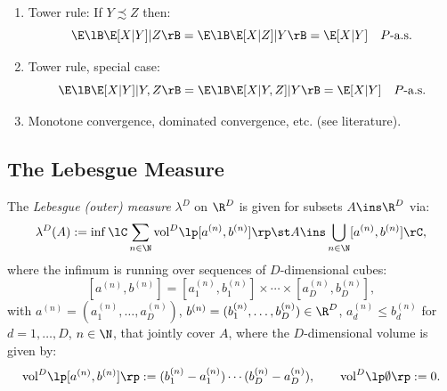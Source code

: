 \begin{Thm}
\begin{enumerate}
        \item Tower rule: If $Y \precsim Z$ then:
            \[ \E\lB\E[X|Y]|Z\rB = \E\lB\E[X|Z]|Y\rB = \E[X|Y]\quad P\text{-a.s.}    \]
        \item Tower rule, special case:
            \[ \E\lB\E[X|Y]|Y,Z\rB = \E\lB\E[X|Y,Z]|Y\rB = \E[X|Y]\quad P\text{-a.s.}    \]
        \item Monotone convergence, dominated convergence, etc. (see literature).
    \end{enumerate}
\end{Thm}


\subsection{The Lebesgue Measure}

\begin{Def}
    \label{thm-lebesgue-measure}
    The \emph{Lebesgue (outer) measure} $\lambda^D$ on $\R^D$ is given for subsets $A \ins \R^D$ via:
    \[ \lambda^D(A) := \inf\lC \sum_{n \in \N} \mathrm{vol}^D\lp [a^{(n)},b^{(n)}] \rp  \st  
    A \ins \bigcup_{n \in \N} [a^{(n)},b^{(n)}]  \rC, \]
    where the infimum is running over sequences of $D$-dimensional cubes:
     \[ [a^{(n)},b^{(n)}] = [a_1^{(n)},b_1^{(n)}] \times \cdots \times [a_D^{(n)}, b_D^{(n)}],\]
  with $a^{(n)}=(a_1^{(n)},\dots,a_D^{(n)})$, $b^{(n)}=(b_1^{(n)},\dots,b_D^{(n)}) \in \R^D$, $a_d^{(n)} \le b_d^{(n)}$ for $d=1,\dots,D$, $n \in \N$, that jointly cover $A$, where the $D$-dimensional volume is given by:
  \[ \mathrm{vol}^D\lp [a^{(n)},b^{(n)}] \rp := (b_1^{(n)}-a_1^{(n)}) \cdots (b_D^{(n)}-a_D^{(n)}),\qquad \mathrm{vol}^D\lp \emptyset \rp :=0. \]
\end{Def}

